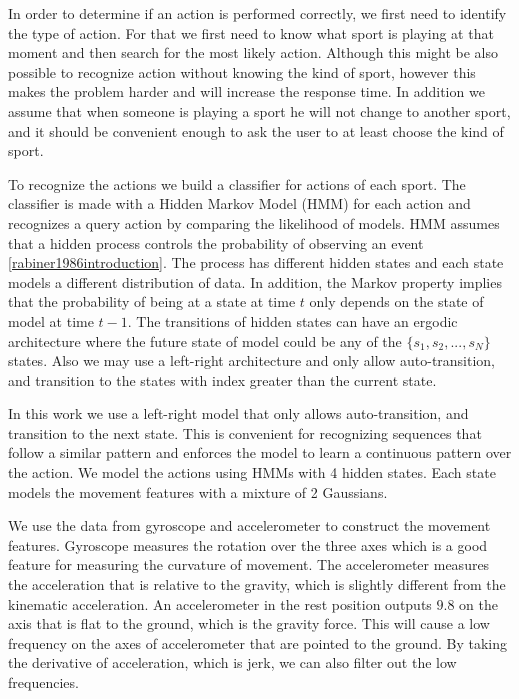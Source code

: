 In order to determine if an action is performed correctly, we first need to identify the type of action. For that we first need to know what sport is playing at that moment and then search for the most likely action. Although this might be also possible to recognize action without knowing the kind of sport, however this makes the problem harder and will increase the response time. In addition we assume that when someone is playing a sport he will not change to another sport, and it should be convenient enough to ask the user to at least choose the kind of sport.

To recognize the actions we build a classifier for actions of each sport. The classifier is made with a Hidden Markov Model (HMM) for each action and recognizes a query action by comparing the likelihood of models. HMM assumes that a hidden process controls the probability of observing an event \ref{rabiner1986introduction}. The process has different hidden states and each state models a different distribution of data. In addition, the Markov property implies that the probability of being at a state at time $t$ only depends on the state of model at time $t-1$. The transitions of hidden states can have an ergodic architecture where the future state of model could be any of the $\{s_1,s_2,...,s_N\}$ states. Also we may use a left-right architecture and only allow auto-transition, and transition to the states with index greater than the current state.

In this work we use a left-right model that only allows auto-transition, and transition to the next state. This is convenient for recognizing sequences that follow a similar pattern and enforces the model to learn a continuous pattern over the action. We model the actions using HMMs with 4 hidden states. Each state models the movement features with a mixture of 2 Gaussians.

We use the data from gyroscope and accelerometer to construct the movement features. Gyroscope measures the rotation over the three axes which is a good feature for measuring the curvature of movement. The accelerometer measures the acceleration that is relative to the gravity, which is slightly different from the kinematic acceleration. An accelerometer in the rest position outputs $9.8$ on the axis that is flat to the ground, which is the gravity force. This will cause a low frequency on the axes of accelerometer that are pointed to the ground. By taking the derivative of acceleration, which is jerk, we can also filter out the low frequencies.


